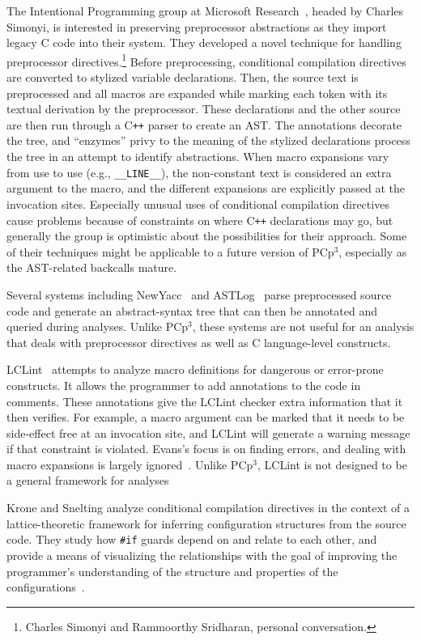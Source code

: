 \documentclass{article}
\newcommand{\pcp}{\mbox{\textsf{PCp}$^3$}}
\newcommand{\CPP}{\mbox{C\texttt{++}}}
\newcommand{\C}{\mbox{C}}
\newcommand{\ppd}[1]{\texttt{\##1}}
\newcommand{\eg}{e.g.,}
\begin{document}
The Intentional Programming group at Microsoft
Research~\cite{Simonyi96}, headed by Charles Simonyi, is interested in
preserving preprocessor abstractions as they import legacy \C{} code
into their system.  They developed a novel technique for handling
preprocessor directives.\footnote{Charles Simonyi and Rammoorthy
  Sridharan, personal conversation.}  Before preprocessing, conditional
compilation directives are converted to stylized variable declarations.
Then, the source text is preprocessed and all macros are expanded while
marking each token with its textual derivation by the preprocessor.
These declarations and the other source are then run through a \CPP{}
parser to create an AST.  The annotations decorate the tree, and
``enzymes'' privy to the meaning of the stylized declarations process
the tree in an attempt to identify abstractions.  When macro expansions
vary from use to use (\eg{} \texttt{\_\_LINE\_\_}), the non-constant
text is considered an extra argument to the macro, and the different
expansions are explicitly passed at the invocation sites. Especially
unusual uses of conditional compilation directives cause problems
because of constraints on where \CPP{} declarations may go, but
generally the group is optimistic about the possibilities for their
approach.  Some of their techniques might be applicable to a future
version of \pcp{}, especially as the AST-related backcalls mature.

Several systems including NewYacc~\cite{Purtilo89} and
ASTLog~\cite{Crew97} parse preprocessed source code and generate an
abstract-syntax tree that can then be annotated and queried during
analyses.  Unlike \pcp{}, these systems are not useful for an analysis
that deals with preprocessor directives as well as \C{} language-level
constructs.

LCLint~\cite{LCLint} attempts to analyze macro definitions for dangerous or
error-prone constructs.  It allows the programmer to add annotations to
the code in comments.  These annotations give the LCLint checker extra
information that it then verifies.  For example, a macro argument can be
marked that it needs to be side-effect free at an invocation site, and
LCLint will generate a warning message if that constraint is violated.
Evans's focus is on finding errors, and dealing with macro expansions is
largely ignored~\cite[Ch.~8]{LCLint}.  Unlike \pcp{}, LCLint is not
designed to be a general framework for analyses

Krone and Snelting analyze conditional compilation directives in the
context of a lattice-theoretic framework for inferring configuration
structures from the source code.  They study how \ppd{if} guards depend
on and relate to each other, and provide a means of visualizing the
relationships with the goal of improving the programmer's understanding
of the structure and properties of the configurations~\cite{Krone94}.
\end{document}
